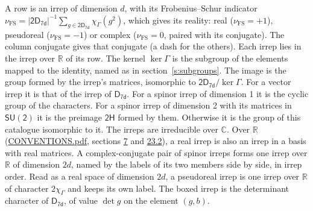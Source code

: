 \documentclass[10pt,a4paper]{article}
\numberwithin{equation}{section}
\newcommand{\grp}[1]{\mathsf{#1}}
\newcommand{\irchar}[1]{\chi_{#1}}
\newcommand{\fsind}{\nu_{\mathrm{FS}}}
\begin{document}
\leavevmode\label{n:index.frobenius}\label{n:head.irrep}\label{n:head.reality}A row is an irrep of dimension $d$, with its Frobenius--Schur indicator $\fsind = |\grp{2D_{7d}}|^{-1}\allowbreak\sum_{g\in\grp{2D_{7d}}}\irchar{\Gamma}(g^2)$, which gives its reality: real ($\fsind = +1$), pseudoreal ($\fsind = -1$) or complex ($\fsind = 0$, paired with its conjugate). \label{n:head.conjugate}The column conjugate gives that conjugate (a dash for the others). \label{n:head.over.real}Each irrep lies in the irrep over $\mathbb{R}$ of its row. \label{n:head.kernel}The kernel $\ker\Gamma$ is the subgroup of the elements mapped to the identity, named as in section~\ref{s:subgroups}. \label{n:head.image}The image is the group formed by the irrep's matrices, isomorphic to $\grp{2D_{7d}}/\ker\Gamma$. For a vector irrep it is that of the irrep of \href{../../../rotation/data/pdf/D7d.pdf}{$\grp{D_{7d}}$}. For a spinor irrep of dimension 1 it is the cyclic group of the characters. For a spinor irrep of dimension 2 with its matrices in $\grp{SU(2)}$ it is the preimage $\grp{2H}$ formed by them. Otherwise it is the group of this catalogue isomorphic to it. The irreps are irreducible over $\mathbb{C}$. Over $\mathbb{R}$ (\href{../../CONVENTIONS.pdf}{CONVENTIONS.pdf}, sections \href{../../../rotation/CONVENTIONS.pdf\#conv.7}{7} and \href{../../CONVENTIONS.pdf\#conv.23.2}{23.2}), a real irrep is also an irrep in a basis with real matrices. A complex-conjugate pair of spinor irreps forms one irrep over $\mathbb{R}$ of dimension $2d$, named by the labels of its two members side by side, in irrep order. Read as a real space of dimension $2d$, a pseudoreal irrep is one irrep over $\mathbb{R}$ of character $2\irchar{\Gamma}$ and keeps its own label. \label{n:mark.determinant}The boxed irrep is the determinant character of \href{../../../rotation/data/pdf/D7d.pdf}{$\grp{D_{7d}}$}, of value $\det g$ on the element $(g, b)$.
\setlength{\emergencystretch}{2em}\par\setlength{\emergencystretch}{0pt}
\end{document}

